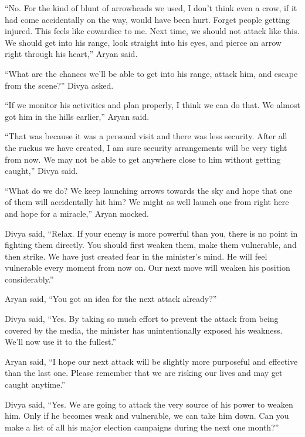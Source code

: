 “No. For the kind of blunt of arrowheads we used, I don't think even a crow, if
it had come accidentally on the way, would have been hurt. Forget people getting
injured. This feels like cowardice to me. Next time, we should not attack like
this. We should get into his range, look straight into his eyes, and pierce an
arrow right through his heart,” Aryan said.

“What are the chances we'll be able to get into his range, attack him, and escape
from the scene?” Divya asked.

“If we monitor his activities and plan properly, I think we can do that. We
almost got him in the hills earlier,” Aryan said.

“That was because it was a personal visit and there was less security. After all
the ruckus we have created, I am sure security arrangements will be very tight
from now. We may not be able to get anywhere close to him without getting
caught,” Divya said.

“What do we do? We keep launching arrows towards the sky and hope that one of
them will accidentally hit him? We might as well launch one from right here and
hope for a miracle,” Aryan mocked.

Divya said, “Relax. If your enemy is more powerful than you, there is no point
in fighting them directly. You should first weaken them, make them vulnerable,
and then strike. We have just created fear in the minister's mind. He will
feel vulnerable every moment from now on. Our next move will weaken his position
considerably.”

Aryan said, “You got an idea for the next attack already?”

Divya said, “Yes. By taking so much effort to prevent the attack from being
covered by the media, the minister has unintentionally exposed his weakness.
We'll now use it to the fullest.”

Aryan said, “I hope our next attack will be slightly more purposeful and
effective than the last one. Please remember that we are risking our lives and
may get caught anytime.”

Divya said, “Yes. We are going to attack the very source of his power to weaken
him. Only if he becomes weak and vulnerable, we can take him down. Can you make
a list of all his major election campaigns during the next one month?”